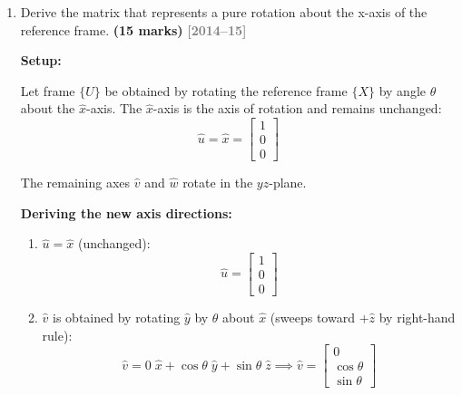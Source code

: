 \documentclass[12pt,a3paper]{article}
\newcommand{\yr}[1]{\hfill\textcolor{gray}{\small\textbf{[#1]}}}
\newcommand{\mk}[1]{\textcolor{orange!70!black}{\small\textbf{(#1 marks)}}}
\begin{document}
\begin{enumerate}
\begin{tcolorbox}[enhanced,breakable,ansbox,colback=cB!4,colframe=cB,
  boxrule=0.8pt,arc=5pt,
  title={\textbf{Answer}},fonttitle=\bfseries\color{white},
  colbacktitle=cB]
\medskip
The end-effector must move relative to its current frame by translating along the vector $[-2, 1, -4]^T$ and applying the rotation defined by the upper-left $3 \times 3$ submatrix.

\end{tcolorbox}

\item \label{qlabel:C2-Q7}
Derive the matrix that represents a pure rotation about the x-axis of
the reference frame. \mk{15}
\yr{2014--15}

\begin{tcolorbox}[enhanced,breakable,ansbox,colback=cB!4,colframe=cB,
  boxrule=0.8pt,arc=5pt,
  title={\textbf{Answer}},fonttitle=\bfseries\color{white},
  colbacktitle=cB]

\textbf{Setup:}

Let frame $\{U\}$ be obtained by rotating the reference frame $\{X\}$
by angle $\theta$ about the $\hat{x}$-axis. The $\hat{x}$-axis is the
axis of rotation and remains unchanged:
\[
  \hat{u} = \hat{x} = \begin{bmatrix}1\\0\\0\end{bmatrix}
\]

The remaining axes $\hat{v}$ and $\hat{w}$ rotate in the $yz$-plane.

\textbf{Deriving the new axis directions:}

\begin{enumerate}[label=\textbf{\arabic*.}]
  \item $\hat{u} = \hat{x}$ (unchanged):
    \[
      \hat{u} = \begin{bmatrix}1\\0\\0\end{bmatrix}
    \]

  \item $\hat{v}$ is obtained by rotating $\hat{y}$ by $\theta$ about
    $\hat{x}$ (sweeps toward $+\hat{z}$ by right-hand rule):
    \[
      \hat{v} = 0\;\hat{x} + \cos\theta\;\hat{y} + \sin\theta\;\hat{z}
      \implies
      \hat{v} = \begin{bmatrix}0\\\cos\theta\\\sin\theta\end{bmatrix}
    \]


\end{enumerate}
\end{tcolorbox}
\end{enumerate}
\end{document}
